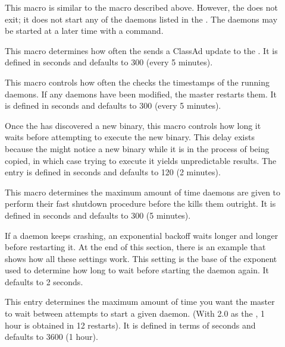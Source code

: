 \begin{description}
\item[] \label{param:StartDaemons} This macro
  is similar to the  macro described above.
  However, the  does not exit; it does not start any
  of the daemons listed in the .
  The daemons may be started at a later time with a 
  command.

\item[]
  \label{param:MasterUpdateInterval} This macro determines how often
  the  sends a ClassAd update to the
  .  It is defined in seconds and defaults to 300
  (every 5 minutes).
  
\item[]
  \label{param:MasterCheckNewExecInterval} This
  macro controls how often the  checks the timestamps
  of the running daemons.  If any daemons have been modified, the
  master restarts them.  It is defined in seconds and defaults to 300
  (every 5 minutes).

\item[]
  \label{param:MasterNewBinaryDelay} Once the  has
  discovered a new binary, this macro controls how long it waits
  before attempting to execute the new binary.  This delay exists
  because the  might notice a new binary while it
  is in the process of being copied,
  in which case trying to execute it yields
  unpredictable results.  The entry is defined in seconds and
  defaults to 120 (2 minutes).

\item[]
  \label{param:ShutdownFastTimeout} This macro determines the maximum
  amount of time daemons are given to perform their
  fast shutdown procedure before the  kills them
  outright.  It is defined in seconds and defaults to 300 (5 minutes).

\item[]
  \label{param:MasterBackoffFactor} If a daemon keeps crashing, an
  exponential backoff waits longer and longer before
  restarting it.  At the end of this section, there is an example that
  shows how all these settings work.  This setting is the base of the
  exponent used to determine how long to wait before starting the
  daemon again.  It defaults to 2 seconds.

\item[]
  \label{param:MasterBackoffCeiling} This entry determines the maximum
  amount of time you want the master to wait between attempts to start
  a given daemon.  (With 2.0 as the ,
  1 hour is obtained in 12 restarts).  It is defined in terms of
  seconds and defaults to 3600 (1 hour).


\end{description}
